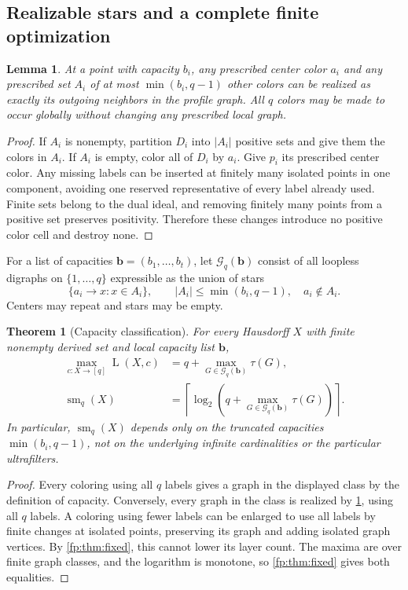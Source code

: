 \documentclass[11pt,letterpaper]{article}
\numberwithin{equation}{section}
\newtheorem{theorem}{Theorem}[section]
\newtheorem{lemma}[lemma]{Lemma}
\theoremstyle{definition}
\theoremstyle{remark}
\theoremstyle{definition}
\newcommand{\sm}{\operatorname{sm}}
\newcommand{\ceil}[1]{\left\lceil#1\right\rceil}
\newcommand{\layers}{\operatorname{L}}
\begin{document}
\subsection{Realizable stars and a complete finite optimization}

\begin{lemma}\label{fp:lem:star-realization}
At a point with capacity \(b_i\), any prescribed center color \(a_i\)
and any prescribed set \(A_i\) of at most \(\min(b_i,q-1)\) other
colors can be realized as exactly its outgoing neighbors in the profile
graph. All \(q\) colors may be made to occur globally without changing
any prescribed local graph.
\end{lemma}
\begin{proof}
If \(A_i\) is nonempty, partition \(D_i\) into \(|A_i|\) positive
sets and give them the colors in \(A_i\). If \(A_i\) is empty, color
all of \(D_i\) by \(a_i\). Give \(p_i\) its prescribed center color.
Any missing labels can be inserted at finitely many isolated points in one
component, avoiding one reserved representative of every label already used.
Finite sets belong to the dual ideal, and removing finitely many
points from a positive set preserves positivity. Therefore these changes
introduce no positive color cell and destroy none.
\end{proof}

For a list of capacities \(\boldsymbol b=(b_1,\ldots,b_t)\), let
\(\mathcal G_q(\boldsymbol b)\) consist of all loopless digraphs on
\(\{1,\ldots,q\}\) expressible as the union of stars
\[
 \{a_i\to x:x\in A_i\},\qquad
 |A_i|\leq\min(b_i,q-1),\quad a_i\notin A_i.
\]
Centers may repeat and stars may be empty.

\begin{theorem}[Capacity classification]\label{fp:thm:capacity}
For every Hausdorff \(X\) with finite nonempty derived set and local
capacity list \(\boldsymbol b\),
\begin{align}
 \max_{c:X\to[q]}\layers(X,c)
 &=q+\max_{G\in\mathcal G_q(\boldsymbol b)}\tau(G),\label{fp:eq:capacity-L}\\
 \sm_q(X)
 &=\ceil{\log_2\!\left(q+\max_{G\in\mathcal G_q(\boldsymbol b)}\tau(G)\right)}.
 \label{fp:eq:capacity-d}
\end{align}
In particular, \(\sm_q(X)\) depends only on the truncated capacities
\(\min(b_i,q-1)\), not on the underlying infinite cardinalities or the
particular ultrafilters.
\end{theorem}
\begin{proof}
Every coloring using all \(q\) labels gives a graph in the displayed
class by the definition of capacity. Conversely, every graph in the class
is realized by \cref{fp:lem:star-realization}, using all \(q\) labels.
A coloring using fewer labels can be enlarged to use all labels by finite
changes at isolated points, preserving its graph and adding isolated graph
vertices. By \cref{fp:thm:fixed}, this cannot lower its layer count.
The maxima are over finite graph classes, and the logarithm is monotone,
so \cref{fp:thm:fixed} gives both equalities.
\end{proof}
\end{document}
